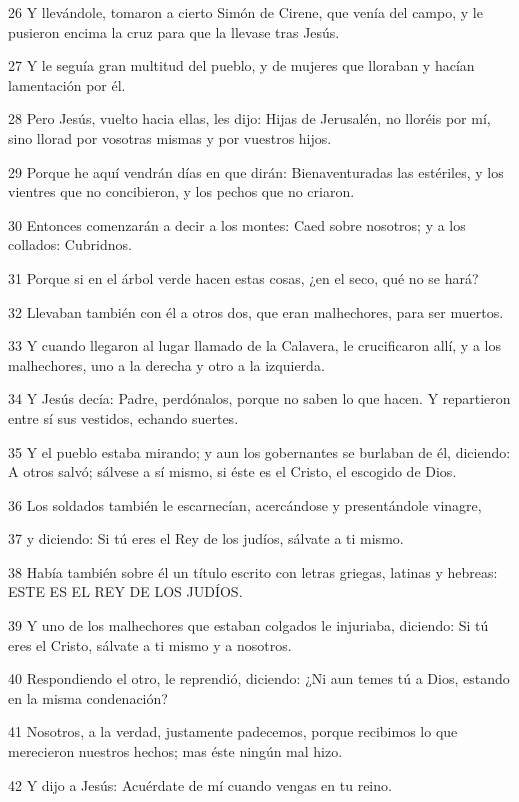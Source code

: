 \par 26 Y llevándole, tomaron a cierto Simón de Cirene, que venía del campo, y le pusieron encima la cruz para que la llevase tras Jesús.
\par 27 Y le seguía gran multitud del pueblo, y de mujeres que lloraban y hacían lamentación por él.
\par 28 Pero Jesús, vuelto hacia ellas, les dijo: Hijas de Jerusalén, no lloréis por mí, sino llorad por vosotras mismas y por vuestros hijos.
\par 29 Porque he aquí vendrán días en que dirán: Bienaventuradas las estériles, y los vientres que no concibieron, y los pechos que no criaron.
\par 30 Entonces comenzarán a decir a los montes: Caed sobre nosotros; y a los collados: Cubridnos.
\par 31 Porque si en el árbol verde hacen estas cosas, ¿en el seco, qué no se hará?
\par 32 Llevaban también con él a otros dos, que eran malhechores, para ser muertos.
\par 33 Y cuando llegaron al lugar llamado de la Calavera, le crucificaron allí, y a los malhechores, uno a la derecha y otro a la izquierda.
\par 34 Y Jesús decía: Padre, perdónalos, porque no saben lo que hacen. Y repartieron entre sí sus vestidos, echando suertes.
\par 35 Y el pueblo estaba mirando; y aun los gobernantes se burlaban de él, diciendo: A otros salvó; sálvese a sí mismo, si éste es el Cristo, el escogido de Dios.
\par 36 Los soldados también le escarnecían, acercándose y presentándole vinagre,
\par 37 y diciendo: Si tú eres el Rey de los judíos, sálvate a ti mismo.
\par 38 Había también sobre él un título escrito con letras griegas, latinas y hebreas: ESTE ES EL REY DE LOS JUDÍOS.
\par 39 Y uno de los malhechores que estaban colgados le injuriaba, diciendo: Si tú eres el Cristo, sálvate a ti mismo y a nosotros.
\par 40 Respondiendo el otro, le reprendió, diciendo: ¿Ni aun temes tú a Dios, estando en la misma condenación?
\par 41 Nosotros, a la verdad, justamente padecemos, porque recibimos lo que merecieron nuestros hechos; mas éste ningún mal hizo.
\par 42 Y dijo a Jesús: Acuérdate de mí cuando vengas en tu reino.
